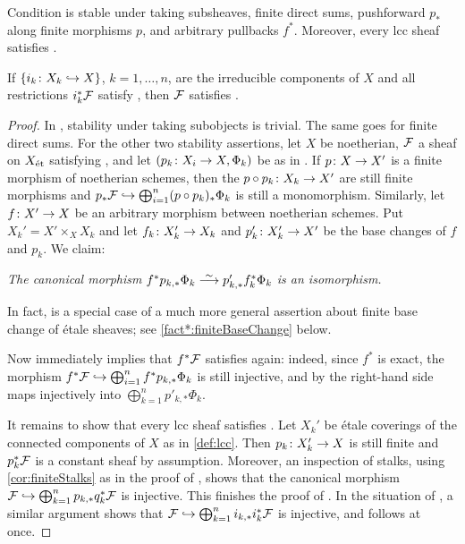 \begin{fact}\label{fact:c2}
	\begin{alphanumerate}
		\item Condition  is stable under taking subsheaves, finite direct sums, pushforward $p_*$ along finite morphisms $p$, and arbitrary pullbacks $f^*$. Moreover, every lcc sheaf satisfies .
		\item If $\{i_k\colon X_k\monomorphism X\}$, $k=1,\dotsc,n$, are the irreducible components of $X$ and all restrictions $i_k^*\mathcal{F}$ satisfy , then $\mathcal{F}$ satisfies .
	\end{alphanumerate}
\end{fact}
\begin{proof}
	In , stability under taking subobjects is trivial. The same goes for finite direct sums. For the other two stability assertions, let $X$ be noetherian, $\mathcal{F}$ a sheaf on $X_{\mathrm{\acute{e}t}}$ satisfying , and let $(p_k\colon X_i\morphism X,\Phi_k)$ be as in . If $p\colon X\morphism X'$ is a finite morphism of noetherian schemes, then the $p\circ p_k\colon X_k\morphism X'$ are still finite morphisms and $p_*\Ff\monomorphism \bigoplus_{i=1}^n(p\circ p_k)_*\Phi_k$ is still a monomorphism. Similarly, let $f\colon X'\morphism X$ be an arbitrary morphism between noetherian schemes. Put $X_k'= X'\times_XX_k$ and let $f_k\colon X_k'\morphism X_k$ and $p_k'\colon X_k'\morphism X'$ be the base changes of $f$ and $p_k$. We claim:
	\begin{alphanumerate}
		\item[\itememph{*}] \itshape The canonical morphism $f^*p_{k,*}\Phi_k\isomorphism p'_{k,*}f_k^*\Phi_k$ is an isomorphism.
	\end{alphanumerate}
	In fact, \itememph{*} is a special case of a much more general assertion about finite base change of étale sheaves; see \cref{fact*:finiteBaseChange} below.
	
	Now \itememph{*} immediately implies that $f^*\mathcal{F}$ satisfies  again: indeed, since $f^*$ is exact, the morphism $f^*\Ff\monomorphism\bigoplus_{i=1}^nf^*p_{k,*}\Phi_k$ is still injective, and by \itememph{*} the right-hand side maps injectively into $\bigoplus_{k=1}^np'_{k,*}\Phi_k$.
	
	It remains to show that every lcc sheaf satisfies . Let $X_k'$ be étale coverings of the connected components of $X$ as in \cref{def:lcc}. Then $p_k\colon X_k'\morphism X$ is still finite and $p_k^*\mathcal{F}$ is a constant sheaf by assumption. Moreover, an inspection of stalks, using \cref{cor:finiteStalks} as in the proof of \itememph{*}, shows that the canonical morphism $\Ff\monomorphism \bigoplus_{k=1}^np_{k,*}q_k^*\Ff$ is injective. This finishes the proof of . In the situation of , a similar argument shows that $\Ff\monomorphism\bigoplus_{k=1}^ni_{k,*}i_k^*\Ff$ is injective, and  follows at once.
\end{proof}

